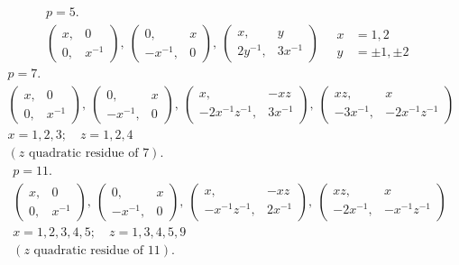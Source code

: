 \[
\begin{gathered}
p = 5.\\[2pt]
\begin{pmatrix} x, & 0 \\ 0, & x^{-1} \end{pmatrix}, \ \begin{pmatrix} 0, & x \\ -x^{-1}, & 0 \end{pmatrix}, \ \begin{pmatrix} x, & y \\ 2y^{-1}, & 3x^{-1} \end{pmatrix} \quad \begin{aligned} x &= 1, 2\\ y &= \pm 1, \pm 2 \end{aligned}
\end{gathered}
\]
\[
\begin{gathered}
p = 7.\\[2pt]
\begin{pmatrix} x, & 0 \\ 0, & x^{-1} \end{pmatrix}, \ \begin{pmatrix} 0, & x \\ -x^{-1}, & 0 \end{pmatrix}, \ \begin{pmatrix} x, & -xz \\ -2x^{-1}z^{-1}, & 3x^{-1} \end{pmatrix}, \ \begin{pmatrix} xz, & x \\ -3x^{-1}, & -2x^{-1}z^{-1} \end{pmatrix}\\[2pt]
x = 1, 2, 3; \quad z = 1, 2, 4\\
(z \text{ quadratic residue of } 7).
\end{gathered}
\]
\[
\begin{gathered}
p = 11.\\[2pt]
\begin{pmatrix} x, & 0 \\ 0, & x^{-1} \end{pmatrix}, \ \begin{pmatrix} 0, & x \\ -x^{-1}, & 0 \end{pmatrix}, \ \begin{pmatrix} x, & -xz \\ -x^{-1}z^{-1}, & 2x^{-1} \end{pmatrix}, \ \begin{pmatrix} xz, & x \\ -2x^{-1}, & -x^{-1}z^{-1} \end{pmatrix}\\[2pt]
x = 1, 2, 3, 4, 5; \quad z = 1, 3, 4, 5, 9\\
(z \text{ quadratic residue of } 11).
\end{gathered}
\]

